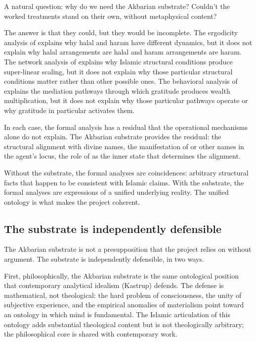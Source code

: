 A natural question: why do we need the Akbarian substrate? Couldn't
the worked treatments stand on their own, without metaphysical
content?

The answer is that they could, but they would be incomplete. The
ergodicity analysis of  explains why halal
and haram have different dynamics, but it does not explain why
halal arrangements are halal and haram arrangements are haram. The
network analysis of  explains why
Islamic structural conditions produce super-linear scaling, but
it does not explain why those particular structural conditions
matter rather than other possible ones. The behavioral analysis of
 explains the mediation pathways through which
gratitude produces wealth multiplication, but it does not
explain why those particular pathways operate or why gratitude in
particular activates them.

In each case, the formal analysis has a residual that the
operational mechanisms alone do not explain. The Akbarian
substrate provides the residual: the structural alignment with
divine names, the manifestation of  or other names
in the agent's locus, the role of  as the inner state
that determines the alignment.

Without the substrate, the formal analyses are coincidences:
arbitrary structural facts that happen to be consistent with
Islamic claims. With the substrate, the formal analyses are
expressions of a unified underlying reality. The unified
ontology is what makes the project coherent.

\subsection{The substrate is independently defensible}

The Akbarian substrate is not a presupposition that the project
relies on without argument. The substrate is independently
defensible, in two ways.

First, philosophically, the Akbarian substrate is the same
ontological position that contemporary analytical idealism
(Kastrup) defends. The defense is mathematical, not theological:
the hard problem of consciousness, the unity of subjective
experience, and the empirical anomalies of materialism point
toward an ontology in which mind is fundamental. The Islamic
articulation of this ontology adds substantial theological
content but is not theologically arbitrary; the philosophical
core is shared with contemporary work.

